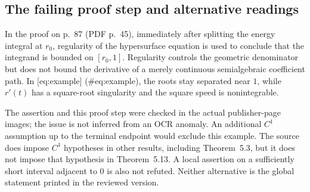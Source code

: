 \documentclass[10pt]{article}
\begin{document}
\subsection*{The failing proof step and alternative readings}
In the proof on p. 87 (PDF p. 45), immediately after splitting the energy integral at \(r_0\), regularity of the hypersurface equation is used to conclude that the integrand is bounded on \([r_0,1]\). Regularity controls the geometric denominator but does not bound the derivative of a merely continuous semialgebraic coefficient path. In [eq:example] (\#eq:example), the roots stay separated near \(1\), while \(r'(t)\) has a square-root singularity and the square speed is nonintegrable.\par
The assertion and this proof step were checked in the actual publisher-page images; the issue is not inferred from an OCR anomaly. An additional \(C^1\) assumption up to the terminal endpoint would exclude this example. The source does impose \(C^1\) hypotheses in other results, including Theorem 5.3, but it does not impose that hypothesis in Theorem 5.13. A local assertion on a sufficiently short interval adjacent to \(0\) is also not refuted. Neither alternative is the global statement printed in the reviewed version.\par
\end{document}
